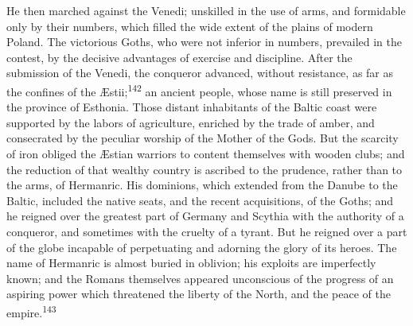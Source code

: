 He then marched against the Venedi; unskilled in the use of arms,
and formidable only by their numbers, which filled the wide
extent of the plains of modern Poland. The victorious Goths, who
were not inferior in numbers, prevailed in the contest, by the
decisive advantages of exercise and discipline. After the
submission of the Venedi, the conqueror advanced, without
resistance, as far as the confines of the Æstii;\textsuperscript{142} an ancient
people, whose name is still preserved in the province of
Esthonia. Those distant inhabitants of the Baltic coast were
supported by the labors of agriculture, enriched by the trade of
amber, and consecrated by the peculiar worship of the Mother of
the Gods. But the scarcity of iron obliged the Æstian warriors to
content themselves with wooden clubs; and the reduction of that
wealthy country is ascribed to the prudence, rather than to the
arms, of Hermanric. His dominions, which extended from the Danube
to the Baltic, included the native seats, and the recent
acquisitions, of the Goths; and he reigned over the greatest part
of Germany and Scythia with the authority of a conqueror, and
sometimes with the cruelty of a tyrant. But he reigned over a
part of the globe incapable of perpetuating and adorning the
glory of its heroes. The name of Hermanric is almost buried in
oblivion; his exploits are imperfectly known; and the Romans
themselves appeared unconscious of the progress of an aspiring
power which threatened the liberty of the North, and the peace of
the empire.\textsuperscript{143}





